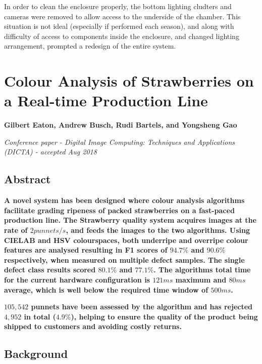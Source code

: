 \documentclass[fleqn,twoside]{article}
\begin{document}
In order to clean the enclosure properly, the bottom lighting cludters and cameras were removed to allow access to the underside of the chamber. This situation is not ideal (especially if performed each season), and along with difficulty of access to components inside the enclosure, and changed lighting arrangement, prompted a redesign of the entire system. 






\newpage
\section{Colour Analysis of Strawberries on a Real-time Production Line}
\label{sec:paper_2}

\textbf{Gilbert Eaton, Andrew Busch, Rudi Bartels, and Yongsheng Gao}

\textit{Conference paper - Digital Image Computing: Techniques and Applications (DICTA) - accepted Aug 2018}


\subsection{Abstract}

\textbf{A novel system has been designed where colour analysis algorithms facilitate grading ripeness of packed strawberries on a fast-paced production line. The Strawberry quality system acquires images at the rate of $2 punnets/s$, and feeds the images to the two algorithms. Using CIELAB and HSV colourspaces, both underripe and overripe colour features are analysed  resulting in F1 scores of $94.7\%$ and $90.6\%$ respectively, when measured on multiple defect samples. The single defect class results scored $80.1\%$ and $77.1\%$. The algorithms total time for the current hardware configuration is $121ms$ maximum and $80ms$ average, which is well below the required time window of $500ms$.}
	
\textbf{$105,542$ punnets have been assessed by the algorithm and has rejected $4,952$ in total ($4.9\%$),  helping to ensure the quality of the product being shipped to customers and avoiding costly returns.}


\subsection{Background}
\end{document}

